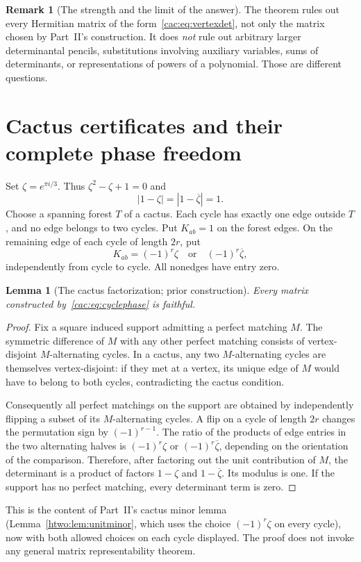 \documentclass[11pt]{article}
\numberwithin{equation}{section}
\newtheorem{lemma}[theorem]{Lemma}
\theoremstyle{definition}
\newtheorem{remark}[theorem]{Remark}
\begin{document}
\begin{remark}[The strength and the limit of the answer]
The theorem rules out every Hermitian matrix of the form~\eqref{cac:eq:vertexdet}, not only the matrix chosen by Part~II's construction. It does \emph{not} rule out arbitrary larger determinantal pencils, substitutions involving auxiliary variables, sums of determinants, or representations of powers of a polynomial. Those are different questions.
\end{remark}

\section{Cactus certificates and their complete phase freedom}
\label{cac:sec:cactus}

Set $\zeta=e^{\pi i/3}$. Thus $\zeta^2-\zeta+1=0$ and
\[
 |1-\zeta|=|1-\overline\zeta|=1.
\]
Choose a spanning forest $T$ of a cactus. Each cycle has exactly one edge outside $T$, and no edge belongs to two cycles. Put $K_{ab}=1$ on the forest edges. On the remaining edge of each cycle of length $2r$, put
\begin{equation}
 K_{ab}=(-1)^r\zeta \quad\text{or}\quad (-1)^r\overline\zeta,
 \label{cac:eq:cyclephase}
\end{equation}
independently from cycle to cycle. All nonedges have entry zero.

\begin{lemma}[The cactus factorization; prior construction]
\label{cac:lem:cactus}
Every matrix constructed by~\eqref{cac:eq:cyclephase} is faithful.
\end{lemma}
\begin{proof}
Fix a square induced support admitting a perfect matching $M$. The symmetric difference of $M$ with any other perfect matching consists of vertex-disjoint $M$-alternating cycles. In a cactus, any two $M$-alternating cycles are themselves vertex-disjoint: if they met at a vertex, its unique edge of $M$ would have to belong to both cycles, contradicting the cactus condition.

Consequently all perfect matchings on the support are obtained by independently flipping a subset of its $M$-alternating cycles. A flip on a cycle of length $2r$ changes the permutation sign by $(-1)^{r-1}$. The ratio of the products of edge entries in the two alternating halves is $(-1)^r\zeta$ or $(-1)^r\overline\zeta$, depending on the orientation of the comparison. Therefore, after factoring out the unit contribution of $M$, the determinant is a product of factors $1-\zeta$ and $1-\overline\zeta$. Its modulus is one. If the support has no perfect matching, every determinant term is zero.
\end{proof}
This is the content of Part~II's cactus minor lemma (Lemma~\ref{htwo:lem:unitminor}, which uses the choice $(-1)^r\zeta$ on every cycle), now with both allowed choices on each cycle displayed. The proof does not invoke any general matrix representability theorem.
\end{document}

